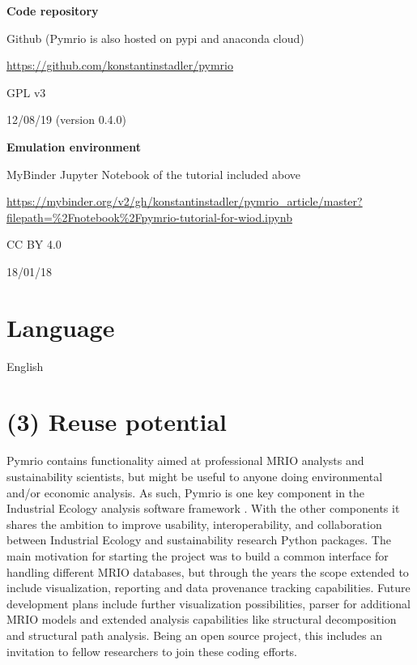 \documentclass{jors}
\begin{document}
{\bf Code repository} 

\begin{description}[noitemsep,topsep=0pt]
    \item[Name:] Github (Pymrio is also hosted on pypi and anaconda cloud)
    \item[Persistent identifier:] \url{https://github.com/konstantinstadler/pymrio}
	\item[Licence:] GPL v3
    \item[Date published:] 12/08/19 (version 0.4.0)
\end{description}

{\bf Emulation environment} 

\begin{description}[noitemsep,topsep=0pt]
	\item[Name:] MyBinder Jupyter Notebook of the tutorial included above
    \item[Persistent identifier:] \url{https://mybinder.org/v2/gh/konstantinstadler/pymrio_article/master?filepath=%2Fnotebook%2Fpymrio-tutorial-for-wiod.ipynb}
        \item[Licence:] CC BY 4.0
	\item[Date published:] 18/01/18
\end{description}

\section*{Language}

English

\section*{(3) Reuse potential}

Pymrio contains functionality aimed at professional MRIO analysts and sustainability scientists, but might be useful to anyone doing environmental and/or economic analysis. 
As such, Pymrio is one key component in the Industrial Ecology analysis software framework \cite{pauliuk2015}.
With the other components it shares the ambition to improve usability, interoperability, and collaboration between Industrial Ecology and sustainability research Python packages.
The main motivation for starting the project was to build a common interface for handling different MRIO databases, but through the years the scope extended to include visualization, reporting and data provenance tracking capabilities.
Future development plans include further visualization possibilities, parser for additional MRIO models and extended analysis capabilities like structural decomposition and structural path analysis.
Being an open source project, this includes an invitation to fellow researchers to join these coding efforts.
\end{document}
